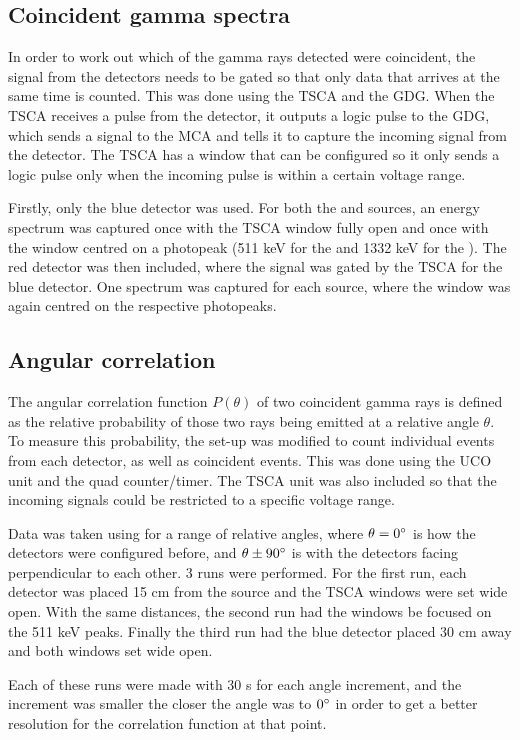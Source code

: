 \documentclass[11pt]{article}
\numberwithin{equation}{section}
\numberwithin{figure}{section}
\numberwithin{table}{section}
\begin{document}
\subsection{Coincident gamma spectra}
\par In order to work out which of the gamma rays detected were coincident, the signal from the detectors needs to be gated so that only data that arrives at the same time is counted. This was done using the TSCA and the GDG. When the TSCA receives a pulse from the detector, it outputs a logic pulse to the GDG, which sends a signal to the MCA and tells it to capture the incoming signal from the detector. The TSCA has a window that can be configured so it only sends a logic pulse only when the incoming pulse is within a certain voltage range.
\par Firstly, only the blue detector was used. For both the  and  sources, an energy spectrum was captured once with the TSCA window fully open and once with the window centred on a photopeak (511 keV for the  and 1332 keV for the ). The red detector was then included, where the signal was gated by the TSCA for the blue detector. One spectrum was captured for each source, where the window was again centred on the respective photopeaks.

\subsection{Angular correlation}
\par The angular correlation function $P(\theta)$ of two coincident gamma rays is defined as the relative probability of those two rays being emitted at a relative angle $\theta$. To measure this probability, the set-up was modified to count individual events from each detector, as well as coincident events. This was done using the UCO unit and the quad counter/timer. The TSCA unit was also included so that the incoming signals could be restricted to a specific voltage range.
\par Data was taken using  for a range of relative angles, where $\theta=0\degree$ is how the detectors were configured before, and $\theta\pm90\degree$ is with the detectors facing perpendicular to each other. 3 runs were performed. For the first run, each detector was placed 15 cm from the source and the TSCA windows were set wide open. With the same distances, the second run had the windows be focused on the 511 keV peaks. Finally the third run had the blue detector placed 30 cm away and both windows set wide open. 
\par Each of these runs were made with 30 s for each angle increment, and the increment was smaller the closer the angle was to $0\degree$ in order to get a better resolution for the correlation function at that point.
\end{document}
